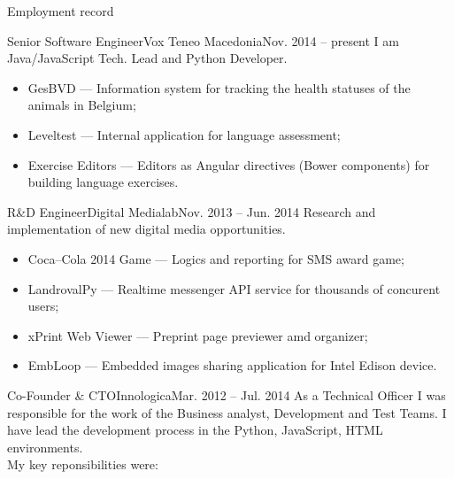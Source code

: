 \documentclass[]{mcdowellcv}
\begin{document}
    \makeheader
    \label{Contact}

    \begin{cvsection}{Employment record}
	\label{Employment Record}
        \begin{cvsubsection}{Senior Software Engineer}{Vox Teneo Macedonia}{Nov. 2014 -- present}
            I am Java/JavaScript Tech. Lead and Python Developer.
            \begin{itemize}
                \item GesBVD --- Information system for tracking the health statuses of the animals in Belgium;
                \item Leveltest --- Internal application for language assessment;
                \item Exercise Editors --- Editors as Angular directives (Bower components) for building language exercises.
            \end{itemize}
        \end{cvsubsection}
        \begin{cvsubsection}{R\&D Engineer}{Digital Medialab}{Nov. 2013 -- Jun. 2014}
            Research and implementation of new digital media opportunities.
            \begin{itemize}
                \item Coca--Cola 2014 Game --- Logics and reporting for SMS award game;
                \item LandrovalPy --- Realtime messenger API service for thousands of concurent users;
                \item xPrint Web Viewer --- Preprint page previewer amd organizer;
                \item EmbLoop --- Embedded images sharing application for Intel Edison device.
            \end{itemize}
        \end{cvsubsection}
        \begin{cvsubsection}{Co-Founder \& CTO}{Innologica}{Mar. 2012 -- Jul. 2014}
            As a Technical Officer I was responsible for the work of the Business analyst, Development and Test Teams.\linebreak
            I have lead the development process in the Python, JavaScript, HTML environments.\\
            My key reponsibilities were:
            \begin{itemize}

\end{itemize}
\end{cvsubsection}
\end{cvsection}
\end{document}
